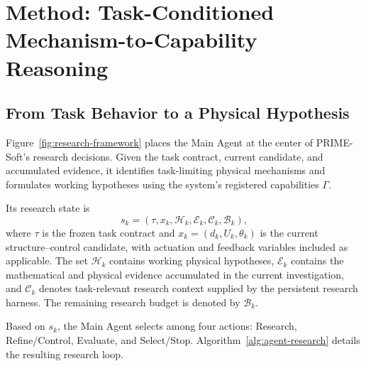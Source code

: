 \section{Method: Task-Conditioned Mechanism-to-Capability Reasoning}
\label{sec:method}
\subsection{From Task Behavior to a Physical Hypothesis}
\label{subsec:overall-framework}

Figure~\ref{fig:research-framework} places the Main Agent at the center of PRIME-Soft's research decisions. Given the task contract, current candidate, and accumulated evidence, it identifies task-limiting physical mechanisms and formulates working hypotheses using the system's registered capabilities $\Gamma$.

Its research state is
\begin{equation}
s_k=(\tau,x_k,\mathcal H_k,\mathcal E_k,\mathcal C_k,\mathcal B_k),
\label{eq:researchstate}
\end{equation}
where $\tau$ is the frozen task contract and $x_k=(d_k,U_k,\theta_k)$ is the current structure--control candidate, with actuation and feedback variables included as applicable. The set $\mathcal H_k$ contains working physical hypotheses, $\mathcal E_k$ contains the mathematical and physical evidence accumulated in the current investigation, and $\mathcal C_k$ denotes task-relevant research context supplied by the persistent research harness. The remaining research budget is denoted by $\mathcal B_k$.

Based on $s_k$, the Main Agent selects among four actions: Research, Refine/Control, Evaluate, and Select/Stop. Algorithm~\ref{alg:agent-research} details the resulting research loop.

